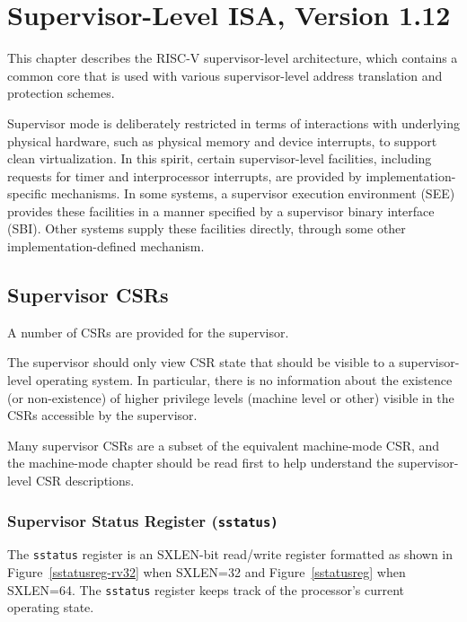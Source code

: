\chapter{Supervisor-Level ISA, Version 1.12}
\label{supervisor}

This chapter describes the RISC-V supervisor-level architecture, which
contains a common core that is used with various supervisor-level
address translation and protection schemes.

\begin{commentary}
Supervisor mode is deliberately restricted in terms of interactions
with underlying physical hardware, such as physical memory and device
interrupts, to support clean virtualization.
In this spirit, certain supervisor-level facilities, including requests for
timer and interprocessor interrupts, are provided by implementation-specific
mechanisms.  In some systems, a supervisor execution environment (SEE)
provides these facilities in a manner specified by a supervisor binary
interface (SBI).  Other systems supply these facilities directly, through some
other implementation-defined mechanism.
\end{commentary}

\section{Supervisor CSRs}

A number of CSRs are provided for the supervisor.

\begin{commentary}
The supervisor should only view CSR state that should be visible to a
supervisor-level operating system.  In particular, there is no
information about the existence (or non-existence) of higher privilege
levels (machine level or other) visible in the CSRs accessible by the
supervisor.

Many supervisor CSRs are a subset of the equivalent machine-mode CSR,
and the machine-mode chapter should be read first to help understand
the supervisor-level CSR descriptions.
\end{commentary}

\subsection{Supervisor Status Register (\tt sstatus)}
\label{sstatus}


The {\tt sstatus} register is an SXLEN-bit read/write register
formatted as shown in Figure~\ref{sstatusreg-rv32} when SXLEN=32 and
Figure~\ref{sstatusreg} when SXLEN=64.  The {\tt sstatus}
register keeps track of the processor's current operating state.

